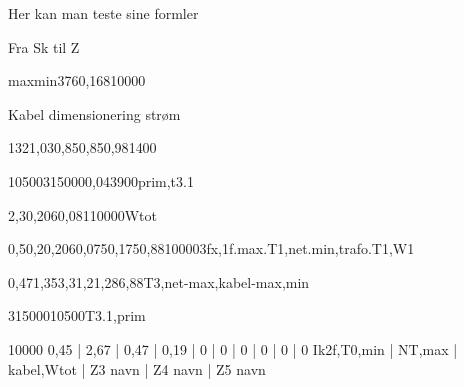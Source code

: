 \documentclass[a4paper,oneside,10pt,danish]{report}
\begin{document}
Her kan man teste sine formler

 
Fra Sk til Z
\begin{FraSkTilZ}{max}{min}{37}{6}{0,168}{10000}
\end{FraSkTilZ}

Kabel dimensionering strøm
\begin{Iz,min}{132}{1,03}{0,85}{0,85}{0,98}{1}{400}
\end{Iz,min}

\begin{Ztrafo}{10500}{315000}{0,04}{3900}{prim,t3.1}
\end{Ztrafo}

\begin{Zkabel}{2,3}{0,206}{0,081}{10000}{Wtot}
\end{Zkabel}


\begin{ZtilIkHV}{0,5}{0,2}{0,206}{0,075}{0,175}{0,88}{10000}{3fx,1f.max.T1,net.min,trafo.T1,W1}
\end{ZtilIkHV}

\begin{Ik1MinSekTrafoHV}{0,47}{1,35}{3,3}{1,2}{1,28}{6,88}{T3,net-max,kabel-max,min}
\end{Ik1MinSekTrafoHV}

\begin{TrafoFuldlast}{315000}{10500}{T3.1,prim}
\end{TrafoFuldlast}

\begin{HV-ZtilIk2f}{10000}{ 0,45 | 2,67 | 0,47 | 0,19 | 0 | 0 | 0 | 0 | 0 | 0 }{Ik2f,T0,min | NT,max | kabel,Wtot | Z3 navn | Z4 navn | Z5 navn}
\end{HV-ZtilIk2f}

\end{document}
